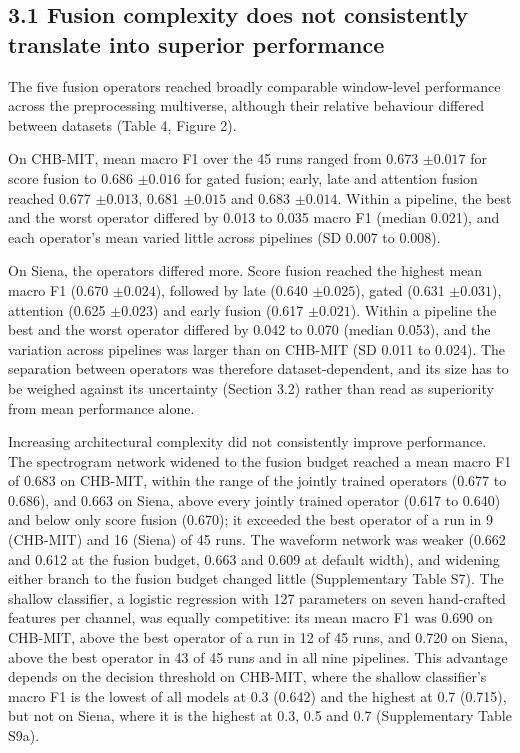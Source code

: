 \documentclass[11pt,a4paper]{article}
\begin{document}
\subsection{3.1 Fusion complexity does not consistently translate into superior performance}\label{fusion-complexity-does-not-consistently-translate-into-superior-performance}

The five fusion operators reached broadly comparable window-level performance across
the preprocessing multiverse, although their relative behaviour differed between
datasets (Table 4, Figure 2).

On CHB-MIT, mean macro F1 over the 45 runs ranged from 0.673 \(\pm 0.017\) for score fusion to
0.686 \(\pm 0.016\) for gated fusion; early, late and attention fusion reached 0.677 \(\pm 0.013\),
0.681 \(\pm 0.015\) and 0.683 \(\pm 0.014.\) Within a pipeline, the best and the worst operator
differed by 0.013 to 0.035 macro F1 (median 0.021), and each operator's mean varied
little across pipelines (SD 0.007 to 0.008).

On Siena, the operators differed more. Score fusion reached the highest mean macro F1
(0.670 \(\pm 0.024\)), followed by late (0.640 \(\pm 0.025\)), gated (0.631 \(\pm 0.031\)), attention
(0.625 \(\pm 0.023\)) and early fusion (0.617 \(\pm 0.021\)). Within a pipeline the best and the worst
operator differed by 0.042 to 0.070 (median 0.053), and the variation across pipelines
was larger than on CHB-MIT (SD 0.011 to 0.024). The separation between operators was
therefore dataset-dependent, and its size has to be weighed against its uncertainty
(Section 3.2) rather than read as superiority from mean performance alone.

Increasing architectural complexity did not consistently improve performance. The
spectrogram network widened to the fusion budget reached a mean macro F1 of 0.683 on
CHB-MIT, within the range of the jointly trained operators (0.677 to 0.686), and 0.663
on Siena, above every jointly trained operator (0.617 to 0.640) and below only score
fusion (0.670); it exceeded the best operator of a run in 9 (CHB-MIT) and 16 (Siena) of
45 runs. The waveform network was weaker (0.662 and 0.612 at the fusion budget, 0.663 and
0.609 at default width), and widening either branch to the fusion budget changed little
(Supplementary Table S7). The shallow classifier, a logistic regression with 127
parameters on seven hand-crafted features per channel, was equally competitive: its
mean macro F1 was 0.690 on CHB-MIT, above the best operator of a run in 12 of 45 runs,
and 0.720 on Siena, above the best operator in 43 of 45 runs and in all nine pipelines.
This advantage depends on the decision threshold on CHB-MIT, where the shallow
classifier's macro F1 is the lowest of all models at 0.3 (0.642) and the highest at 0.7
(0.715), but not on Siena, where it is the highest at 0.3, 0.5 and 0.7
(Supplementary Table S9a).
\end{document}
